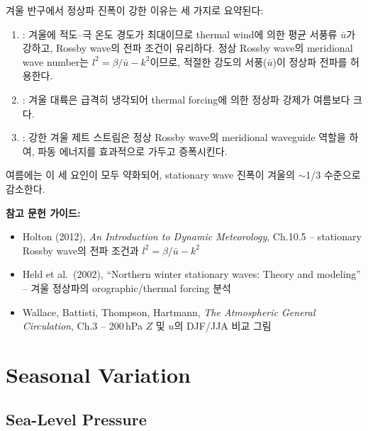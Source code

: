 \begin{remark}
겨울 반구에서 정상파 진폭이 강한 이유는 세 가지로 요약된다:
\begin{enumerate}
  \item {}: 겨울에 적도--극 온도 경도가 최대이므로 thermal wind에 의한
        평균 서풍류 $\bar{u}$가 강하고, Rossby wave의 전파 조건이 유리하다.
        정상 Rossby wave의 meridional wave number는 $l^{2} = \beta/\bar{u} - k^{2}$이므로,
        적절한 강도의 서풍($\bar{u}$)이 정상파 전파를 허용한다.
  \item {}: 겨울 대륙은 급격히 냉각되어
        thermal forcing에 의한 정상파 강제가 여름보다 크다.
  \item {}: 강한 겨울 제트 스트림은 정상 Rossby wave의
        meridional waveguide 역할을 하여, 파동 에너지를 효과적으로 가두고 증폭시킨다.
\end{enumerate}
여름에는 이 세 요인이 모두 약화되어, stationary wave 진폭이 겨울의 $\sim$1/3 수준으로 감소한다.
\end{remark}

\begin{hisublock}
\textbf{참고 문헌 가이드:}
\begin{itemize}
  \item Holton (2012), \textit{An Introduction to Dynamic Meteorology}, Ch.10.5 -- stationary Rossby wave의 전파 조건과 $l^{2} = \beta/\bar{u} - k^{2}$
  \item Held et al.\ (2002), ``Northern winter stationary waves: Theory and modeling'' -- 겨울 정상파의 orographic/thermal forcing 분석
  \item Wallace, Battisti, Thompson, Hartmann, \textit{The Atmospheric General Circulation}, Ch.3 -- 200\,hPa $Z$ 및 $u$의 DJF/JJA 비교 그림
\end{itemize}
\end{hisublock}


\section{Seasonal Variation}
\label{sec:ch03-seasonal}

\subsection{Sea-Level Pressure}

